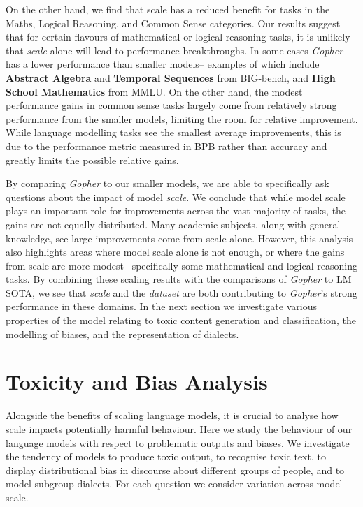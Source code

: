 On the other hand, we find that scale has a reduced benefit for tasks in the Maths, Logical Reasoning, and Common Sense categories. Our results suggest that for certain flavours of mathematical or logical reasoning tasks, it is unlikely that \textit{scale} alone will lead to performance breakthroughs. In some cases \textit{Gopher} has a lower performance than smaller models-- examples of which include \textbf{Abstract Algebra} and \textbf{Temporal Sequences} from BIG-bench, and \textbf{High School Mathematics} from MMLU. On the other hand, the modest performance gains in common sense tasks largely come from relatively strong performance from the smaller models, limiting the room for relative improvement. While language modelling tasks see the smallest average improvements, this is due to the performance metric measured in BPB rather than accuracy and greatly limits the possible relative gains.

By comparing \textit{Gopher} to our smaller models, we are able to specifically ask questions about the impact of model \textit{scale}. 
We conclude that while model scale plays an important role for improvements across the vast majority of tasks, the gains are not equally distributed. Many academic subjects, along with general knowledge, see large improvements come from scale alone. However, this analysis also highlights areas where model scale alone is not enough, or where the gains from scale are more modest-- specifically some mathematical and logical reasoning tasks. By combining these scaling results with the comparisons of \textit{Gopher} to LM SOTA, we see that \textit{scale} and the \textit{dataset} are both contributing to \textit{Gopher}'s strong performance in these domains. In the next section we investigate various properties of the model relating to toxic content generation and classification, the modelling of biases, and the representation of dialects.

\section{Toxicity and Bias Analysis}
\label{sec:model_analysis}

Alongside the benefits of scaling language models, it is crucial to analyse how scale impacts potentially harmful behaviour. Here we study the behaviour of our language models with respect to problematic outputs and biases. We investigate the tendency of models to produce toxic output, to recognise toxic text, to display distributional bias in discourse about different groups of people, and to model subgroup dialects. For each question we consider variation across model scale.

